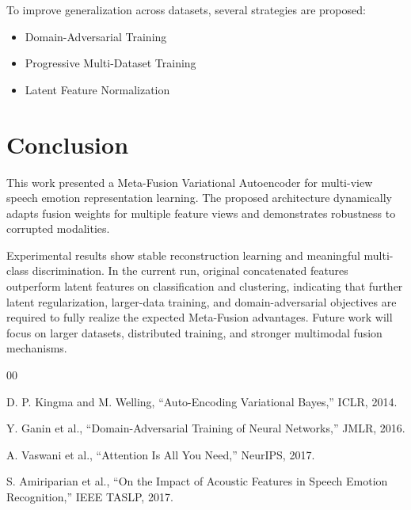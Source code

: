\documentclass[conference]{IEEEtran}
\begin{document}
To improve generalization across datasets, several strategies are proposed:

\begin{itemize}
\item Domain-Adversarial Training
\item Progressive Multi-Dataset Training
\item Latent Feature Normalization
\end{itemize}

\section{Conclusion}

This work presented a Meta-Fusion Variational Autoencoder for multi-view speech emotion representation learning. The proposed architecture dynamically adapts fusion weights for multiple feature views and demonstrates robustness to corrupted modalities.

Experimental results show stable reconstruction learning and meaningful multi-class discrimination. In the current run, original concatenated features outperform latent features on classification and clustering, indicating that further latent regularization, larger-data training, and domain-adversarial objectives are required to fully realize the expected Meta-Fusion advantages. Future work will focus on larger datasets, distributed training, and stronger multimodal fusion mechanisms.

\begin{thebibliography}{00}

D. P. Kingma and M. Welling, ``Auto-Encoding Variational Bayes,'' ICLR, 2014.

Y. Ganin et al., ``Domain-Adversarial Training of Neural Networks,'' JMLR, 2016.

A. Vaswani et al., ``Attention Is All You Need,'' NeurIPS, 2017.

S. Amiriparian et al., ``On the Impact of Acoustic Features in Speech Emotion Recognition,'' IEEE TASLP, 2017.

\end{thebibliography}
\end{document}
